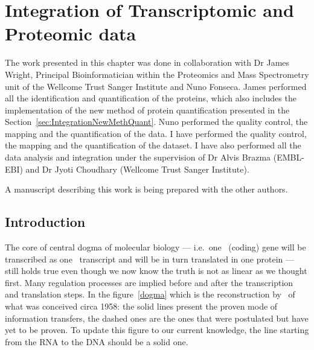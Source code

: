 \chapter{Integration of Transcriptomic and Proteomic data}
\label{sec:Integration}
The work presented in this chapter was done in collaboration with Dr James Wright,
Principal Bioinformatician within the Proteomics and Mass Spectrometry unit of the
Wellcome Trust Sanger Institute and Nuno Fonseca. James performed all the
identification and quantification of the proteins, which also includes the
implementation of the new method of protein quantification presented in the
Section~\ref{sec:IntegrationNewMethQuant}. Nuno performed the quality
control, the mapping and the quantification of the  data.
I have performed the quality control, the mapping and the quantification of the
 dataset. I have also performed
all the data analysis and integration under the supervision of Dr Alvis Brazma
(EMBL-EBI) and Dr Jyoti Choudhary (Wellcome Trust Sanger Institute).

A manuscript describing this work is being prepared with the other authors.

\section{Introduction}
\label{sec:IntegrationIntro}
%
%

The core of central dogma of molecular biology --- i.e.\ one \DNA\ (coding) gene
will be transcribed as one \mRNA\ transcript and will be in turn translated in
one protein --- still holds true even though we now know the truth is not as
linear as we thought first. Many regulation processes are implied before
and after the transcription and translation steps.
In the figure~\ref{dogma} which is the reconstruction by~\cite{Crick:1958} of
what was conceived circa 1958: the solid lines present the proven mode of
information transfers, the dashed ones are the ones that were postulated but
have yet to be proven. To update this figure to our current knowledge, the line
starting from the RNA to the DNA should be a solid one.

